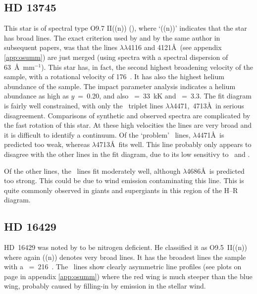 \subsection{HD 13745}  %
\label{analysis:hd013745}

This star is of spectral type O9.7 II((n)) (\cite{wa:76}), where `((n))'
indicates that the star has broad lines. The exact criterion used by
 and by the same author in subsequent papers, was that
the lines $\lambda\lambda$4116 and 4121\AA\ (see appendix
\ref{app:osumm}) are just merged (using spectra with a spectral
dispersion of 63~\AA~mm$^{-1}$). This star has, in fact, the second
highest broadening velocity of the sample, with a rotational velocity
of 176~\kms. It has also the highest helium abundance of the
sample. The impact parameter analysis indicates a helium abundance as
high as $y$~=~0.20, and also \teff~=~33~kK and \logg~=~3.3. The fit
diagram is fairly well constrained, with only the \hei\ triplet lines
$\lambda\lambda$4471,~4713\AA\ in serious disagreement. Comparisons of
synthetic and observed spectra are complicated by the fast rotation of
this star. At these high velocities the lines are very broad and it is
difficult to identify a continuum. Of the `problem' \hei\ lines,
$\lambda$4471\AA\ is predicted too weak, whereas $\lambda$4713\AA\
fits well. This line probably only appears to disagree with the other
lines in the fit diagram, due to its low sensitivy to \teff\ and \logg.

Of the other lines, the \heii\ lines fit moderately well, although
$\lambda$4686\AA\ is predicted too strong. This could be due to wind
emission contaminating this line. This is quite commonly observed in
giants and supergiants in this region of the H--R diagram.


\subsection{HD 16429}  %
\label{analysis:hd016429}

HD~16429 was noted by  to be nitrogen deficient. He
classified it as O9.5~II((n)) where again ((n)) denotes very broad
lines. It has the broadest lines the sample with a
\vsini~=~216~\kms. The \hi\ lines show clearly asymmetric line
profiles (see plots on page
\pageref{sec:summary_hd016429} in appendix
\ref{app:osumm}) where the red wing is much steeper than the blue wing, 
probably caused by filling-in by emission in the stellar wind.

